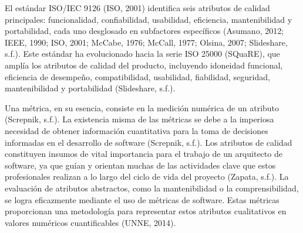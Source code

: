 \documentclass[11pt]{article}
\begin{document}
El estándar ISO/IEC 9126 (ISO, 2001) identifica seis atributos de calidad principales: funcionalidad, confiabilidad, usabilidad, eficiencia, mantenibilidad y portabilidad, cada uno desglosado en subfactores específicos (Asumano, 2012; IEEE, 1990; ISO, 2001; McCabe, 1976; McCall, 1977; Olsina, 2007; Slideshare, s.f.). Este estándar ha evolucionado hacia la serie ISO 25000 (SQuaRE), que amplía los atributos de calidad del producto, incluyendo idoneidad funcional, eficiencia de desempeño, compatibilidad, usabilidad, fiabilidad, seguridad, mantenibilidad y portabilidad (Slideshare, s.f.).

Una métrica, en su esencia, consiste en la medición numérica de un atributo (Screpnik, s.f.). La existencia misma de las métricas se debe a la imperiosa necesidad de obtener información cuantitativa para la toma de decisiones informadas en el desarrollo de software (Screpnik, s.f.). Los atributos de calidad constituyen insumos de vital importancia para el trabajo de un arquitecto de software, ya que guían y orientan muchas de las actividades clave que estos profesionales realizan a lo largo del ciclo de vida del proyecto (Zapata, s.f.). La evaluación de atributos abstractos, como la mantenibilidad o la comprensibilidad, se logra eficazmente mediante el uso de métricas de software. Estas métricas proporcionan una metodología para representar estos atributos cualitativos en valores numéricos cuantificables (UNNE, 2014).
\end{document}
